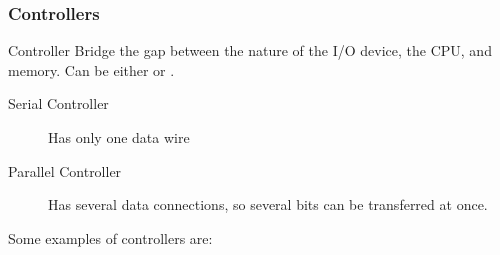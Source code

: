 \documentclass[../notes.tex]{subfiles}
\begin{document}
				\subsubsection{Controllers}
					\begin{definition}{Controller}
						Bridge the gap between the nature of the I/O device, the CPU, and memory. Can be either  or .
						\begin{indentparagraph}
							\begin{description}
								\item[Serial Controller] Has only one data wire
								\item[Parallel Controller] Has several data connections, so several bits can be transferred at once.
							\end{description}
						\end{indentparagraph}
					\end{definition}
					Some examples of controllers are:
\end{document}
